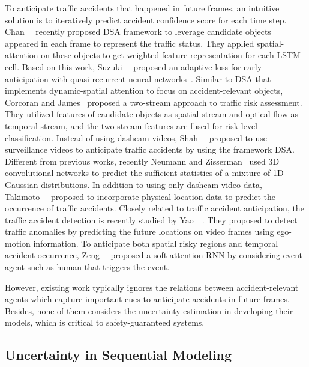 \documentclass[sigconf]{acmart}
\begin{document}
To anticipate traffic accidents that happened in future frames, an intuitive solution is to iteratively predict accident confidence score for each time step. Chan~\etal~\cite{ChanACCV2016} recently proposed DSA framework to leverage candidate objects appeared in each frame to represent the traffic status. They applied spatial-attention on these objects to get weighted feature representation for each LSTM cell. Based on this work, Suzuki~\etal~\cite{SuzukiCVPR2018} proposed an adaptive loss for early anticipation with quasi-recurrent neural networks~\cite{BradburyICLR2017}. Similar to DSA that implements dynamic-spatial attention to focus on accident-relevant objects, Corcoran and James~\cite{CorcoranCRV2019} proposed a two-stream approach to traffic risk assessment. They utilized features of candidate objects as spatial stream and optical flow as temporal stream, and the two-stream features are fused for risk level classification. Instead of using dashcam videos, Shah~\etal~\cite{ShahT4SW2018} proposed to use surveillance videos to anticipate traffic accidents by using the framework DSA. Different from previous works, recently Neumann and Zisserman~\cite{NeumannCVPRW2019} used 3D convolutional networks to predict the sufficient statistics of a mixture of 1D Gaussian distributions. In addition to using only dashcam video data, Takimoto~\etal~\cite{TakimotoPredictGIS2019} proposed to incorporate physical location data to predict the occurrence of traffic accidents. Closely related to traffic accident anticipation, the traffic accident detection is recently studied by Yao~\etal~\cite{YaoIROS2019}. They proposed to detect traffic anomalies by predicting the future locations on video frames using ego-motion information. To anticipate both spatial risky regions and temporal accident occurrence, Zeng~\etal~\cite{ZengCVPR2017} proposed a soft-attention RNN by considering event agent such as human that triggers the event.

However, existing work typically ignores the relations between accident-relevant agents which capture important cues to anticipate accidents in future frames. Besides, none of them considers the uncertainty estimation in developing their models, which is critical to safety-guaranteed systems.

\subsection{Uncertainty in Sequential Modeling}
\end{document}
